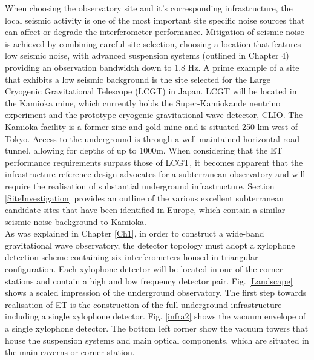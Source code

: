 When choosing the observatory site and it's corresponding infrastructure, the local seismic activity is one of the most important site specific noise sources that can affect or degrade the interferometer performance. Mitigation of seismic noise is achieved by combining careful site selection, choosing a location that features low seismic noise, with advanced suspension systems (outlined in Chapter 4) providing an observation bandwidth down to 1.8 Hz. A prime example of a site that exhibits a low seismic background is the site selected for the Large Cryogenic Gravitational Telescope (LCGT) in Japan. LCGT will be located in the Kamioka mine, which currently holds the Super-Kamiokande neutrino experiment and the prototype cryogenic gravitational wave detector, CLIO. The Kamioka facility is a former zinc and gold mine and is situated 250 km west of Tokyo. Access to the underground is through a well maintained horizontal road tunnel, allowing for depths of up to 1000m. When considering that the ET performance requirements surpass those of LCGT, it becomes apparent that the infrastructure reference design advocates for a subterranean observatory and will require the realisation of substantial underground infrastructure. Section \ref{SiteInvestigation} provides an outline of the various excellent subterranean candidate sites that have been identified in Europe, which contain a similar seismic noise background to Kamioka.\\

As was explained in Chapter \ref{Ch1}, in order to construct a wide-band gravitational wave observatory, the detector topology must adopt a xylophone detection scheme containing six interferometers housed in triangular configuration. Each xylophone detector will be located in one of the corner stations and contain a high and low frequency detector pair. Fig. \ref{Landscape} shows a scaled impression of the underground observatory. The first step towards realisation of ET is the construction of the full underground infrastructure including a single xylophone detector. Fig. \ref{infra2} shows the vacuum envelope of a single xylophone detector. The bottom left corner show the vacuum towers that house the suspension systems and main optical components, which are situated in the main caverns or corner station. 

